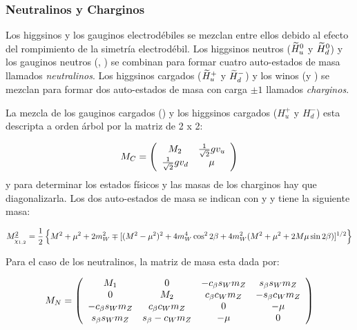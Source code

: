 \subsubsection{Neutralinos y Charginos}\label{sec:mass_NC}

Los higgsinos y los gauginos electrodébiles se mezclan entre ellos debido al
efecto del rompimiento de la simetría electrodébil. Los higgsinos neutros
($\widetilde{H}_u^0$ y $\widetilde{H}_d^0$) y los gauginos neutros (\bino, \winozero) se
combinan para formar cuatro auto-estados de masa llamados \emph{neutralinos}.
Los higgsinos cargados ($\widetilde{H}_u^+$ y $\widetilde{H}_d^-$) y los winos (\winop y
\winom) se mezclan para formar dos auto-estados de masa con carga $\pm 1$
llamados \emph{charginos}.

La mezcla de los gauginos cargados (\winopm) y los higgsinos cargados ($H_u^+$ y
$H_d^-$) esta descripta a orden árbol por la matriz de 2 x 2:

\begin{equation}
  M_{C} = \left(
  \begin{array}{cc}
    M_{2} & \frac{1}{\sqrt{2}} g v_u \\ \frac{1}{\sqrt{2}} g v_d & \mu \\
  \end{array}
  \right)
\end{equation}
%
y para determinar los estados físicos y las masas de los charginos hay que
diagonalizarla. Los dos auto-estados de masa se indican con {\chinoonepm} y
{\chinotwopm} y tiene la siguiente masa:

\begin{equation}
  M^2_{\widetilde{\chi}_{1,2}} = \frac{1}{2} \left\{ M^2 + \mu^2 + 2 m_W^2 \mp
  [(M^2-\mu^2)^2 + 4 m_W^4 \cos^2 2\beta + 4 m_W^2 (M^2+\mu^2 + 2 M \mu \sin
    2\beta)]^{1/2} \right\}
\end{equation}



Para el caso de los neutralinos, la matriz de masa esta dada por:

\begin{equation}
  M_{N} = \left(
  \begin{array}{cccc}
    M_{1} & 0 & -c_\beta s_W m_Z & s_\beta s_W m_Z \\ 0 & M_{2} & c_\beta c_W
    m_Z & -s_\beta c_W m_Z \\

    -c_\beta s_W m_Z & c_\beta c_W m_Z & 0 & -\mu \\ s_\beta s_W m_Z & s_\beta
    -c_W m_Z & -\mu & 0 \\
  \end{array}
  \right)
\end{equation}

